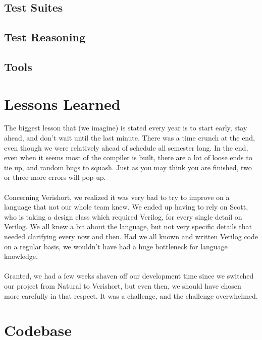 \documentclass[letterpaper,11pt]{article}
\begin{document}
    \subsection{Test Suites}
    \subsection{Test Reasoning}
    \subsection{Tools}
    
\section{Lessons Learned}
The biggest lesson that (we imagine) is stated every year is to start early, stay ahead, and 
don't wait until the last minute. There was a time crunch at the end, even though we were 
relatively ahead of schedule all semester long. In the end, even when it seems most of the compiler 
is built, there are a lot of loose ends to tie up, and random bugs to squash. Just as you may think 
you are finished, two or three more errors will pop up.\\\\
Concerning Verishort, we realized it was very bad to try to improve on a language that not our whole team 
knew. We ended up having to rely on Scott, who is taking a design class which required Verilog, for 
every single detail on Verilog. We all knew a bit about the language, but not very specific details 
that needed clarifying every now and then. Had we all known and written Verilog code on a regular 
basis, we wouldn't have had a huge bottleneck for language knowledge.\\\\ 
Granted, we had a few weeks shaven off our development time since we switched our project from Natural 
to Verishort, but even then, we should have chosen more carefully in that respect. It was a challenge, 
and the challenge overwhelmed. 
\newpage
        
\section{Codebase}










\end{document}
